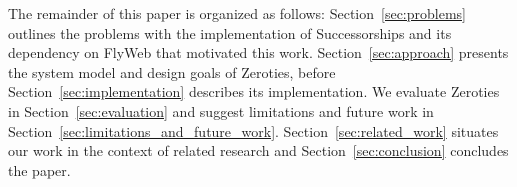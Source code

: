 The remainder of this paper is organized as follows: Section~\ref{sec:problems} outlines the problems with the implementation of Successorships and its dependency on FlyWeb that motivated this work. Section~\ref{sec:approach} presents the system model and design goals of Zeroties, before Section~\ref{sec:implementation} describes its implementation. We evaluate Zeroties in Section~\ref{sec:evaluation} and suggest limitations and future work in Section~\ref{sec:limitations_and_future_work}. Section~\ref{sec:related_work} situates our work in the context of related research and Section~\ref{sec:conclusion} concludes the paper.


